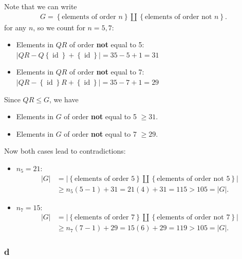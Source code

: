 \begin{solution}
Note that we can write
\begin{align*}
G = \left\{{\text{elements of order } n}\right\} {\coprod}\left\{{\text{elements of order not } n}\right\}
.\end{align*}
for any \(n\), so we count for \(n=5, 7\):

\begin{itemize}
\tightlist
\item
  Elements in \(QR\) of order \textbf{not} equal to 5:
  \({\left\lvert {QR - Q\left\{{\operatorname{id}}\right\} + \left\{{\operatorname{id}}\right\}} \right\rvert} = 35 - 5 + 1 = 31\)
\item
  Elements in \(QR\) of order \textbf{not} equal to 7:
  \({\left\lvert {QR - \left\{{\operatorname{id}}\right\}R + \left\{{\operatorname{id}}\right\}} \right\rvert} = 35 - 7 + 1 = 29\)
\end{itemize}

Since \(QR \leq G\), we have

\begin{itemize}
\tightlist
\item
  Elements in \(G\) of order \textbf{not} equal to 5 \(\geq 31\).
\item
  Elements in \(G\) of order \textbf{not} equal to 7 \(\geq 29\).
\end{itemize}

Now both cases lead to contradictions:

\begin{itemize}
\item
  \(n_5 = 21\):
  \begin{align*}
  {\left\lvert {G} \right\rvert}  &= {\left\lvert {\left\{{\text{elements of order } 5}\right\} {\coprod}\left\{{\text{elements of order not } 5}\right\}} \right\rvert} \\
  &\geq n_5(5-1) + 31 = 21(4) + 31 = 115 > 105 = {\left\lvert {G} \right\rvert}
  .\end{align*}
\item
  \(n_7 = 15\):
  \begin{align*}
  {\left\lvert {G} \right\rvert}  &= {\left\lvert {\left\{{\text{elements of order } 7}\right\} {\coprod}\left\{{\text{elements of order not } 7}\right\}} \right\rvert} \\
  &\geq n_7(7-1) + 29 = 15(6) + 29 = 119 > 105 = {\left\lvert {G} \right\rvert}
  .\end{align*}
\end{itemize}

\hypertarget{d-4}{%
\subsubsection{d}\label{d-4}}


\end{solution}
